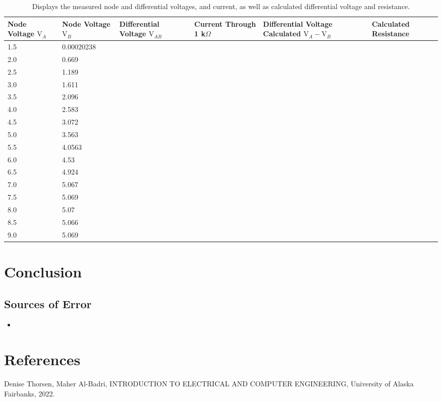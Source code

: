 \documentclass{article}
\begin{document}
\begin{table}[H]
\begin{tabularx}{\textwidth}{ | X | X | X | X | X | X | }
	\hline
	\textbf{Node Voltage $\text{V}_A$} &
	\textbf{Node Voltage $\text{V}_B$} &
	\textbf{Differential Voltage $\text{V}_{AB}$} &
	\textbf{Current Through 1 k$\Omega$} &
	\textbf{Differential Voltage Calculated $\text{V}_A-\text{V}_B$} &
	\textbf{Calculated Resistance} \\
	\hline
	1.5 & 0.00020238 & & & & \\
	2.0 & 0.669      & & & & \\
	2.5 & 1.189      & & & & \\
	3.0 & 1.611      & & & & \\
	3.5 & 2.096      & & & & \\
	4.0 & 2.583      & & & & \\
	4.5 & 3.072      & & & & \\
	5.0 & 3.563      & & & & \\
	5.5 & 4.0563     & & & & \\
	6.0 & 4.53       & & & & \\
	6.5 & 4.924      & & & & \\
	7.0 & 5.067      & & & & \\
	7.5 & 5.069      & & & & \\
	8.0 & 5.07       & & & & \\
	8.5 & 5.066      & & & & \\
	9.0 & 5.069      & & & & \\
	\hline
\end{tabularx}
\caption{\label{tab:table-name}Displays the measured node and differential voltages, and current, as well as calculated differential voltage and resistance.}
\end{table}

\newpage
\section{Conclusion}


\subsection{Sources of Error}

\begin{itemize}
	\item 
\end{itemize}


\newpage
\section{References}
\noindent
[1] Denise Thorsen, Maher Al-Badri, INTRODUCTION TO ELECTRICAL AND COMPUTER ENGINEERING, University of Alaska Fairbanks, 2022.
\newline
\newline
\noindent
\end{document}

